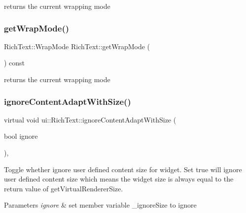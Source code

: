 returns the current wrapping mode \mbox{\label{classui_1_1RichText_ae502474a4a692215e7458ff13a46c623}} 
\subsubsection{\texorpdfstring{get\+Wrap\+Mode()}{getWrapMode()}\hspace{0.1cm}{\footnotesize\ttfamily [2/2]}}
{\footnotesize\ttfamily Rich\+Text\+::\+Wrap\+Mode Rich\+Text\+::get\+Wrap\+Mode (\begin{DoxyParamCaption}{ }\end{DoxyParamCaption}) const}

returns the current wrapping mode \mbox{\label{classui_1_1RichText_a82b3965a42f134415afab5605ef73ffa}} 
\subsubsection{\texorpdfstring{ignore\+Content\+Adapt\+With\+Size()}{ignoreContentAdaptWithSize()}\hspace{0.1cm}{\footnotesize\ttfamily [1/2]}}
{\footnotesize\ttfamily virtual void ui\+::\+Rich\+Text\+::ignore\+Content\+Adapt\+With\+Size (\begin{DoxyParamCaption}\item[{bool}]{ignore }\end{DoxyParamCaption})\hspace{0.3cm}{\ttfamily [override]}, {\ttfamily [virtual]}}

Toggle whether ignore user defined content size for widget. Set true will ignore user defined content size which means the widget size is always equal to the return value of {\ttfamily get\+Virtual\+Renderer\+Size}.


\begin{DoxyParams}{Parameters}
{\em ignore} & set member variable \+\_\+ignore\+Size to ignore \\
\hline
\end{DoxyParams}


